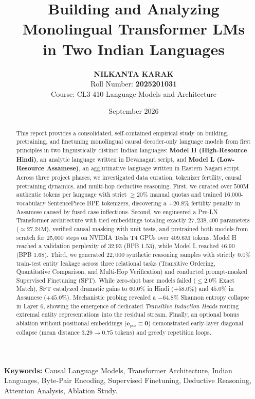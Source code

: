 \documentclass[11pt,a4paper]{article}
\title{\vspace{-1.2cm}\textbf{\Large Building and Analyzing Monolingual Transformer LMs\\in Two Indian Languages}}
\author{\textbf{NILKANTA KARAK} \\
Roll Number: \textbf{2025201031} \\
Course: CL3-410 Language Models and Architecture}
\date{September 2026}
\begin{document}
\maketitle

\begin{abstract}
This report provides a consolidated, self-contained empirical study on building, pretraining, and finetuning monolingual causal decoder-only language models from first principles in two linguistically distinct Indian languages: \textbf{Model H (High-Resource Hindi)}, an analytic language written in Devanagari script, and \textbf{Model L (Low-Resource Assamese)}, an agglutinative language written in Eastern Nagari script. Across three project phases, we investigated data curation, tokenizer fertility, causal pretraining dynamics, and multi-hop deductive reasoning. First, we curated over $500\text{M}$ authentic tokens per language with strict $\ge 20\%$ manual quotas and trained 16,000-vocabulary SentencePiece BPE tokenizers, discovering a $+20.8\%$ fertility penalty in Assamese caused by fused case inflections. Second, we engineered a Pre-LN Transformer architecture with tied embeddings totaling exactly $27,238,400$ parameters ($\approx 27.24\text{M}$), verified causal masking with unit tests, and pretrained both models from scratch for 25,000 steps on NVIDIA Tesla T4 GPUs over $409.6\text{M}$ tokens. Model H reached a validation perplexity of $32.93$ (BPB $1.53$), while Model L reached $46.90$ (BPB $1.68$). Third, we generated $22,000$ synthetic reasoning samples with strictly $0.0\%$ train-test entity leakage across three relational tasks (Transitive Ordering, Quantitative Comparison, and Multi-Hop Verification) and conducted prompt-masked Supervised Finetuning (SFT). While zero-shot base models failed ($\le 2.0\%$ Exact Match), SFT catalyzed dramatic gains to $60.0\%$ in Hindi ($+58.0\%$) and $45.0\%$ in Assamese ($+45.0\%$). Mechanistic probing revealed a $-64.8\%$ Shannon entropy collapse in Layer 6, showing the emergence of dedicated \textit{Transitive Induction Heads} routing extremal entity representations into the residual stream. Finally, an optional bonus ablation without positional embeddings ($\mathbf{e}_{\text{pos}} \equiv \mathbf{0}$) demonstrated early-layer diagonal collapse (mean distance $3.29 \to 0.75$ tokens) and greedy repetition loops.
\end{abstract}

\vspace{0.3em}
\noindent\textbf{Keywords:} Causal Language Models, Transformer Architecture, Indian Languages, Byte-Pair Encoding, Supervised Finetuning, Deductive Reasoning, Attention Analysis, Ablation Study.
\end{document}
